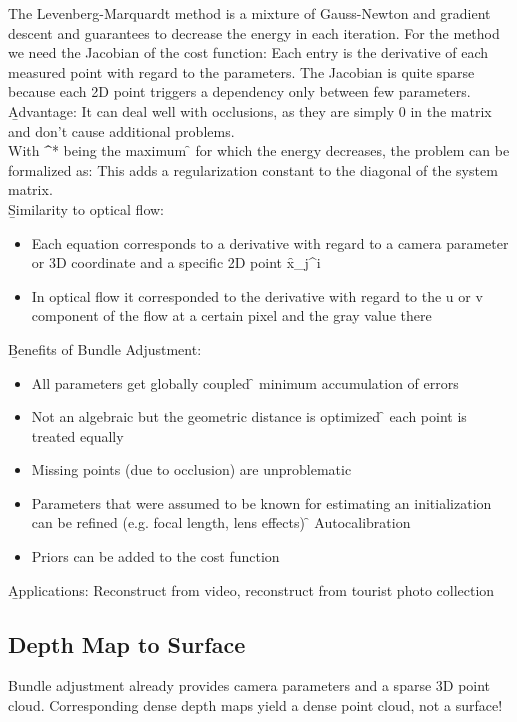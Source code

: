 The Levenberg-Marquardt method is a mixture of Gauss-Newton and gradient descent and guarantees to decrease the energy in each iteration. For the method we need the Jacobian of the cost function:
Each entry is the derivative of each measured point with regard to the parameters. The Jacobian is quite sparse because each 2D point triggers a dependency only between few parameters.\\

\b{Advantage:} It can deal well with occlusions, as they are simply 0 in the matrix and don't cause additional problems.\\

With \f{\tau^*} being the maximum \f{\tau} for which the energy decreases, the problem can be formalized as:
This adds a regularization constant to the diagonal of the system matrix.\\

\b{Similarity to optical flow:}
\begin{itemize}
    \item Each equation corresponds to a derivative with regard to a camera parameter or 3D coordinate and a specific 2D point \f{x_j^i}
    \item In optical flow it corresponded to the derivative with regard to the u or v component of the flow at a certain pixel and the gray value there
\end{itemize}
\vspace{0.5em}
\b{Benefits of Bundle Adjustment:}
\begin{itemize}
    \item All parameters get globally coupled \f{\to} minimum accumulation of errors
    \item Not an algebraic but the geometric distance is optimized \f{\to} each point is treated equally
    \item Missing points (due to occlusion) are unproblematic
    \item Parameters that were assumed to be known for estimating an initialization can be refined (e.g. focal length, lens effects) \f{\to} Autocalibration
    \item Priors can be added to the cost function
\end{itemize}
\newpage
\b{Applications:} Reconstruct from video, reconstruct from tourist photo collection

\subsection{Depth Map to Surface}
Bundle adjustment already provides camera parameters and a sparse 3D point cloud. Corresponding dense depth maps yield a dense point cloud, not a surface!\\

